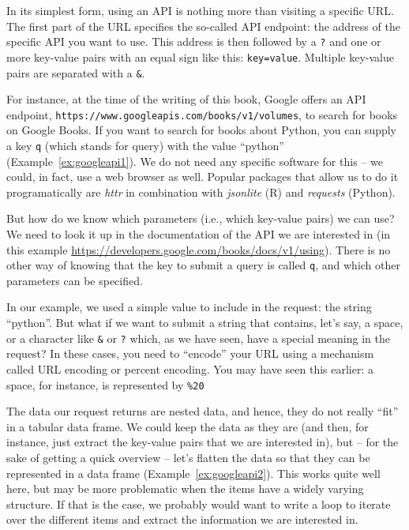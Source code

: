 In its simplest form, using an API is nothing more than visiting
a specific URL. The first part of the URL specifies the so-called
API endpoint: the address of the specific API you want to use. This
address is then followed by a \verb|?| and one or more key-value pairs with an
equal sign like this: \verb|key=value|. Multiple key-value pairs are
separated with a \texttt{\&}.

For instance, at the time of the writing of this book, Google offers
an API endpoint, \verb|https://www.googleapis.com/books/v1/volumes|, to search for books on Google Books.
If you want to search for books about Python, you can supply a key \verb|q| (which stands for query) with
the value ``python'' (Example~\ref{ex:googleapi1}). We do not need any specific
software for this -- we could, in fact, use a web browser as well.
Popular packages that allow us to do it programatically are \emph{httr}
in combination with \emph{jsonlite} (R) and \emph{requests} (Python).

But how do we know which parameters (i.e., which key-value pairs) we can use?
We need to look it up in the documentation of the API we are
interested in (in this example \url{https://developers.google.com/books/docs/v1/using}).
There is no other way of knowing that the key to submit a query
is called \verb|q|, and which other parameters can be specified.

\begin{feature}
  In our example, we used a simple value to include in the request:
  the string ``python''.  But what if we want to submit a string that
  contains, let's say, a space, or a character like \verb|&| or \verb|?| which,
  as we have seen, have a special meaning in the request? In these
  cases, you need to ``encode'' your URL using a mechanism called URL
  encoding or percent encoding. You may have seen this earlier: a
  space, for instance, is represented by \texttt{\%20}
\end{feature}


The data our request returns are nested data, and hence, they do not
really ``fit'' in a tabular data frame. We could keep the data as they
are (and then, for instance, just extract the key-value pairs that we
are interested in), but -- for the sake of getting a quick overview --
let's flatten the data so that they can be represented in a data frame
(Example~\ref{ex:googleapi2}). This works quite well here, but may be more
problematic when the items have a widely varying structure. If that
is the case, we probably would want to write a loop to iterate
over the different items and extract the information we are interested in.

